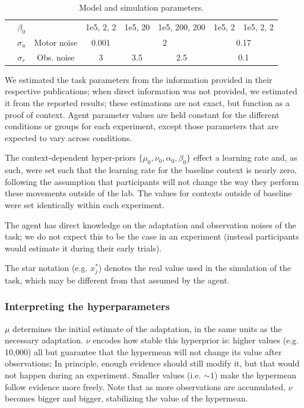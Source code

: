 \documentclass[a4paper,doc,floatsintext,natbib]{apa6}%
\begin{document}
\begin{table}[h!]
{\begin{tabular}{|c|c|c|c|c|c|c|c|c|c|c|}
  \cline{2-2} \cline{4-11}
  & $\beta_0$ & & 1e5, 2, 2 & \multicolumn{2}{c|}{1e5, 20} & \multicolumn{2}{c|}{1e5, 200, 200} & \multicolumn{2}{c|}{1e5, 2} & 1e5, 2, 2 \\
  \cline{2-11}
  & $\sigma_u$ & Motor noise & 0.001 & \multicolumn{4}{c|}{2} & \multicolumn{3}{c|}{0.17} \\
  \cline{2-11}
  & $\sigma_r$& Obs. noise & 3 & \multicolumn{2}{c|}{3.5} & \multicolumn{2}{c|}{2.5} & \multicolumn{3}{c|}{0.1} \\
  \cline{1-11}
  \end{tabular}}
\caption{Model and simulation parameters.}
\label{tab:parameters}
\end{table}

We estimated the task parameters from the information provided in their respective publications; when direct information was not provided, we estimated it from the reported results; these estimations are not exact, but function as a proof of context. Agent parameter values are held constant for the different conditions or groups for each experiment, except those parameters that are expected to vary across conditions.

The context-dependent hyper-priors $\{\mu_0, \nu_0, \alpha_0, \beta_0\}$ effect a learning rate and, as such, were set such that the learning rate for the baseline context is nearly zero, following the assumption that participants will not change the way they perform these movements outside of the lab. The values for contexts outside of baseline were set identically within each experiment.


The agent has direct knowledge on the adaptation and observation noises of the task; we do not expect this to be the case in an experiment (instead participants would estimate it during their early trials). 

The star notation (e.g. $x_j^*$) denotes the real value used in the simulation of the task, which may be different from that assumed by the agent.

\subsubsection{Interpreting the hyperparameters}
\label{sec:interpreting-hyperparameters}
$\mu$ determines the initial estimate of the adaptation, in the same units as
the necessary adaptation. $\nu$ encodes how stable this hyperprior is: higher
values (e.g. 10,000) all but guarantee that the hypermean will not change its
value after observations; In principle, enough evidence should still modify it,
but that would not happen during an experiment. Smaller values (i.e. $\sim 1$)
make the hypermean follow evidence more freely. Note that as more observations
are accumulated, $\nu$ becomes bigger and bigger, stabilizing the value of the
hypermean.
\end{document}
